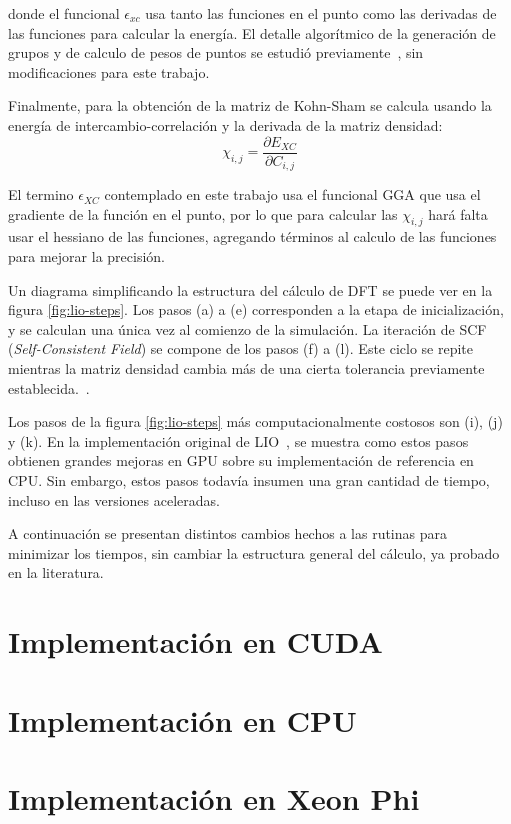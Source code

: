 donde el funcional $\epsilon_{xc}$ usa tanto las funciones en el punto como las derivadas de las funciones para
calcular la energ\'ia. El detalle algor\'itmico de la generaci\'on de grupos y de calculo de pesos de puntos
se estudi\'o previamente~\cite{Nitsche2014,TesisNitsche}, sin modificaciones para este trabajo.

Finalmente, para la obtenci\'on de la matriz de Kohn-Sham se calcula usando la energ\'ia de intercambio-correlaci\'on
y la derivada de la matriz densidad:
\begin{equation}
  \chi_{i,j} = \frac{\partial E_{XC}}{\partial C_{i,j}}
\end{equation}

El termino $\epsilon_{XC}$ contemplado en este trabajo usa el funcional GGA que usa el gradiente de la funci\'on
en el punto, por lo que para calcular las $\chi_{i,j}$ har\'a falta usar el hessiano de las funciones, agregando
t\'erminos al calculo de las funciones para mejorar la precisi\'on.

Un diagrama simplificando la estructura del c\'alculo de DFT se puede ver en la figura \ref{fig:lio-steps}.
Los pasos (a) a (e) corresponden a la etapa de inicializaci\'on, y se calculan una \'unica vez
al comienzo de la simulaci\'on. La iteraci\'on de SCF (\textit{Self-Consistent Field}) se
compone de los pasos (f) a (l). Este ciclo se repite mientras la matriz densidad cambia
m\'as de una cierta tolerancia previamente establecida.~\cite{Nitsche2014}.

Los pasos de la figura \ref{fig:lio-steps} m\'as computacionalmente costosos son (i), (j) y (k).
En la implementaci\'on original de LIO~\cite{TesisNitsche}, se muestra como estos pasos
obtienen grandes mejoras en GPU sobre su implementaci\'on de referencia en CPU. Sin embargo,
estos pasos todav\'ia insumen una gran cantidad de tiempo, incluso en las versiones aceleradas.

A continuaci\'on se presentan distintos cambios hechos a las rutinas para minimizar los tiempos,
sin cambiar la estructura general del c\'alculo, ya probado en la literatura.

\section{Implementaci\'on en CUDA}



\section{Implementaci\'on en CPU}



\section{Implementaci\'on en Xeon Phi}


